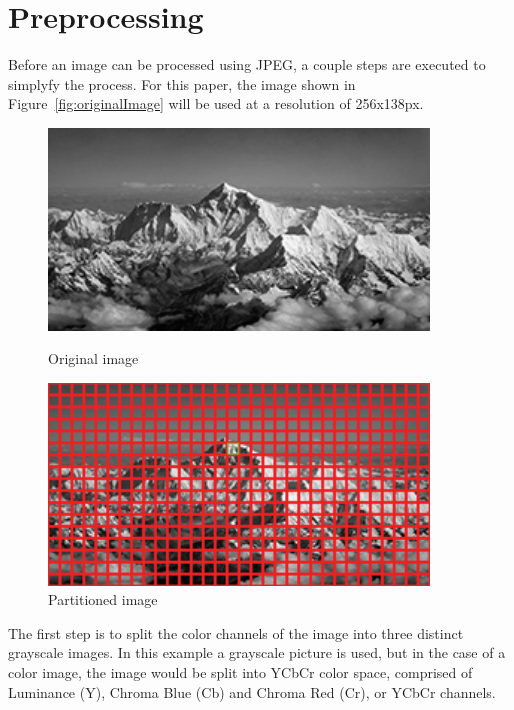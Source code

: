 \documentclass[11pt]{article}
\begin{document}
\section{Preprocessing}
\label{sec: preprocessing}

Before an image can be processed using JPEG, a couple steps are executed to simplyfy the process.
For this paper, the image shown in Figure~\ref{fig:originalImage} will be used at a resolution of 256x138px.
\begin{figure}
  \centering
  \begin{minipage}{0.45\textwidth}
      \centering
      \includegraphics[width=0.9\textwidth]{./images/original.jpg}
      \caption{Original image}
      \label{fig:originalImage}
  \end{minipage}\hfill
  \begin{minipage}{0.45\textwidth}
      \centering
      \includegraphics[width=0.9\textwidth]{./images/partitioned_highlight.jpg}
      \caption{Partitioned image}
      \label{fig:partitionedImage}
  \end{minipage}
\end{figure}
The first step is to split the color channels of the image into three distinct grayscale images.
In this example a grayscale picture is used, but in the case of a color image, the image would be split into YCbCr color space, comprised of Luminance (Y), Chroma Blue (Cb) and Chroma Red (Cr), or YCbCr channels.
\end{document}
